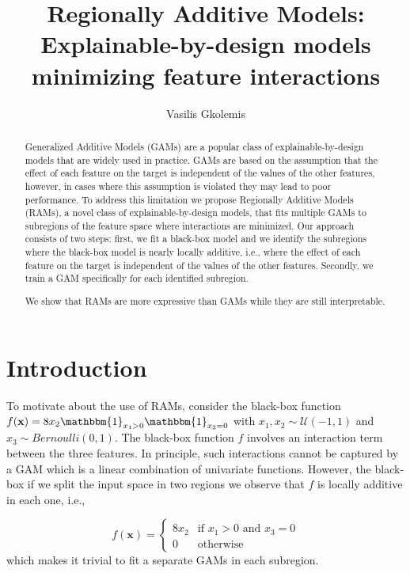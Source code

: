 \documentclass[12pt]{article}
\title{Regionally Additive Models: Explainable-by-design models minimizing feature interactions}
\author{Vasilis Gkolemis}
\newcommand{\xb}{\mathbf{x}}
\newcommand{\when}[1]{\mathbbm{1}_{#1}}
\begin{document}
\maketitle

\begin{abstract}
Generalized Additive Models (GAMs) are a popular class of explainable-by-design models that are widely used in practice.
GAMs are based on the assumption that the effect of each feature on the target is independent of the values of the
other features, however, in cases where this assumption is violated they may lead to poor performance.
To address this limitation we propose Regionally Additive Models (RAMs), a novel class of explainable-by-design models,
that fits multiple GAMs to subregions of the feature space where interactions are minimized.
Our approach consists of two steps: first, we fit a black-box model and we identify the subregions where the black-box model is nearly locally additive,
i.e., where the effect of each feature on the target is independent of the values of the other features.
Secondly, we train a GAM specifically for each identified subregion.

We show that RAMs are more expressive than GAMs while they are still interpretable.

\end{abstract}

\section{Introduction}

To motivate about the use of RAMs, consider the black-box function
\(f(\xb) = 8x_2\when{x_1 > 0}\when{x_3=0}\) with \(x_1, x_2 \sim \mathcal{U}(-1,1)\) and \(x_3 \sim Bernoulli(0,1)\).
The black-box function $f$ involves an interaction term between the three features.
In principle, such interactions cannot be captured by a GAM which is a linear combination of univariate functions.
However, the black-box if we split the input space in two regions we observe that $f$ is locally additive
in each one, i.e.,

\begin{equation}
    f(\xb) = \begin{cases} 8x_2 & \text{if } x_1 > 0 \text{ and } x_3 = 0 \\ 0 & \text{otherwise} \end{cases}
\end{equation}
%
which makes it trivial to fit a separate GAMs in each subregion.
\end{document}
